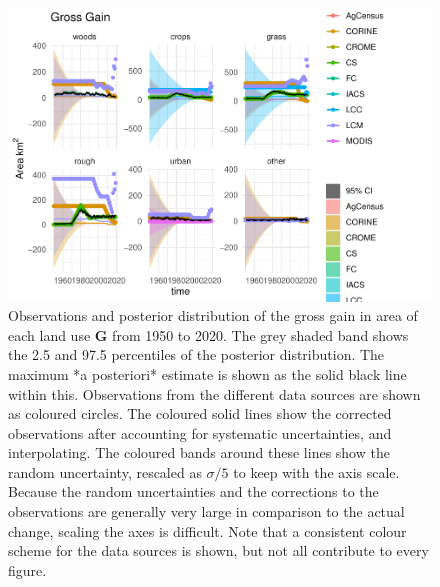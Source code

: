 \documentclass[
]{book}
\begin{document}
\begin{figure}
\includegraphics[width=1.3\linewidth]{Results_wa_files/figure-latex/plotG-1} \caption{ Observations and posterior distribution of the gross gain in area of each land use $\mathbf{G}$ from 1950 to 2020.  The grey shaded band shows the 2.5 and 97.5 percentiles of the posterior distribution. The maximum *a posteriori* estimate is shown as the solid black line within this. Observations from the different data sources are shown as coloured circles. The coloured solid lines show the corrected observations after accounting for systematic uncertainties, and interpolating. The coloured bands around these lines show the random uncertainty, rescaled as $\sigma /5$ to keep with the axis scale. Because the random uncertainties and the corrections to the observations are generally very large in comparison to the actual change, scaling the axes is difficult. Note that a consistent colour scheme for the data sources is shown, but not all contribute to every figure.}\label{fig:plotG}
\end{figure}
\end{document}

